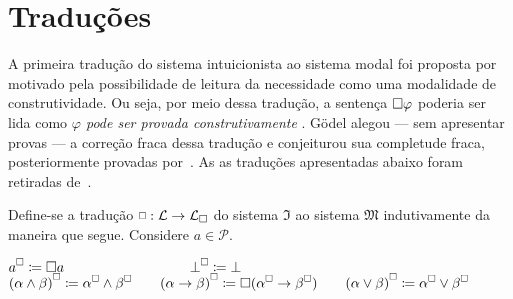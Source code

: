 \section{Traduções}
    A primeira tradução do sistema intuicionista ao sistema modal foi proposta por~\cite{Goedel} motivado pela possibilidade de leitura da necessidade como uma modalidade de construtividade. Ou seja, por meio dessa tradução, a sentença $\Box \varphi$ poderia ser lida como \textit{$\varphi$ pode ser provada construtivamente} \citep{Troelstra}. Gödel alegou --- sem apresentar provas --- a correção fraca dessa tradução e conjeiturou sua completude fraca, posteriormente provadas por~\cite{McKinsey}. As as traduções apresentadas abaixo foram retiradas de~\cite{Troelstra}.

    \vspace{0.5\baselineskip}
    \begin{tcolorbox}[enhanced jigsaw, breakable, sharp corners, colframe=black, colback=white, boxrule=0.5pt, left=1.5mm, right=1.5mm, top=1.5mm, bottom=1.5mm]
    \begin{definition}\label{translation.square}
        Define-se a tradução $\squareee:\mathcal{L}\to\mathcal{L}_{\nec}$ do sistema $\mathfrak{I}$ ao sistema $\mathfrak{M}$ indutivamente da maneira que segue.
        Considere $a\in\mathcal{P}$.

        \begin{center}
            $a^\medsquare\coloneqq\nec a\quad\quad\quad\quad\quad\quad\quad\quad\quad\bot^\medsquare\coloneqq\bot$\\\vspace{0.5\baselineskip}
            ${(\alpha\wedge\beta)}^\medsquare\coloneqq\alpha^\medsquare\wedge\beta^\medsquare\quad\quad{(\alpha \to \beta)}^\medsquare\coloneqq \nec (\alpha^\medsquare \to \beta^\medsquare)\quad\quad{(\alpha\vee\beta)}^\medsquare\coloneqq\alpha^\medsquare\vee\beta^\medsquare$
        \end{center}
    \end{definition}
    \end{tcolorbox}

